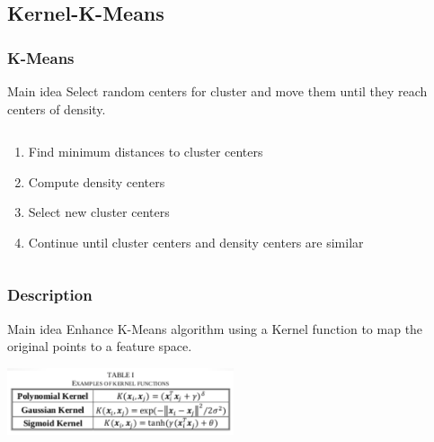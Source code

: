 \documentclass[10p]{beamer}
\begin{document}
\subsection{Kernel-K-Means}
\begin{frame}
\frametitle{K-Means}
\begin{block}{Main idea}
Select random centers for cluster and move them until they reach centers of density.
\end{block}
\begin{columns}
\begin{column}{0.6\textwidth}
\begin{enumerate}
\item Find minimum distances to cluster centers
\item Compute density centers
\item Select new cluster centers
\item Continue until cluster centers and density centers are similar
\end{enumerate}
\end{column}
\begin{column}{0.4\textwidth}
\end{column}
\end{columns}
\end{frame}
\begin{frame}
\frametitle{Description}
\begin{block}{Main idea}
Enhance K-Means algorithm using a Kernel function to map the original points to a feature space.
\end{block}
\begin{center}
\includegraphics[width=0.5\textwidth]{Image/kernel.png}
\end{center}
\end{frame}
\end{document}
